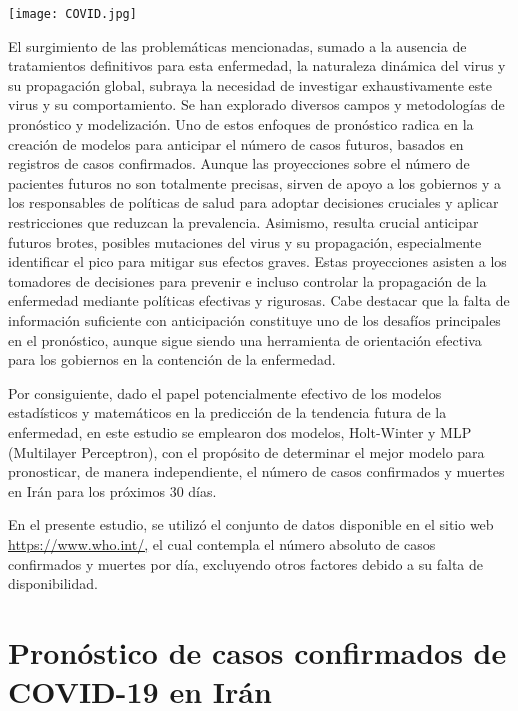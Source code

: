 \documentclass[
  letterpaper,
  DIV=11,
  numbers=noendperiod]{scrreport}
\theoremstyle{plain}
\theoremstyle{definition}
\theoremstyle{definition}
\theoremstyle{plain}
\theoremstyle{remark}
\begin{document}
\begin{center}
\texttt{[image: COVID.jpg]}
\end{center}

El surgimiento de las problemáticas mencionadas, sumado a la ausencia de
tratamientos definitivos para esta enfermedad, la naturaleza dinámica
del virus y su propagación global, subraya la necesidad de investigar
exhaustivamente este virus y su comportamiento. Se han explorado
diversos campos y metodologías de pronóstico y modelización. Uno de
estos enfoques de pronóstico radica en la creación de modelos para
anticipar el número de casos futuros, basados en registros de casos
confirmados. Aunque las proyecciones sobre el número de pacientes
futuros no son totalmente precisas, sirven de apoyo a los gobiernos y a
los responsables de políticas de salud para adoptar decisiones cruciales
y aplicar restricciones que reduzcan la prevalencia. Asimismo, resulta
crucial anticipar futuros brotes, posibles mutaciones del virus y su
propagación, especialmente identificar el pico para mitigar sus efectos
graves. Estas proyecciones asisten a los tomadores de decisiones para
prevenir e incluso controlar la propagación de la enfermedad mediante
políticas efectivas y rigurosas. Cabe destacar que la falta de
información suficiente con anticipación constituye uno de los desafíos
principales en el pronóstico, aunque sigue siendo una herramienta de
orientación efectiva para los gobiernos en la contención de la
enfermedad.

Por consiguiente, dado el papel potencialmente efectivo de los modelos
estadísticos y matemáticos en la predicción de la tendencia futura de la
enfermedad, en este estudio se emplearon dos modelos, Holt-Winter y MLP
(Multilayer Perceptron), con el propósito de determinar el mejor modelo
para pronosticar, de manera independiente, el número de casos
confirmados y muertes en Irán para los próximos 30 días.

En el presente estudio, se utilizó el conjunto de datos disponible en el
sitio web \url{https://www.who.int/,} el cual contempla el número
absoluto de casos confirmados y muertes por día, excluyendo otros
factores debido a su falta de disponibilidad.

\chapter{Pronóstico de casos confirmados de COVID-19 en
Irán}\label{pronuxf3stico-de-casos-confirmados-de-covid-19-en-iruxe1n}
\end{document}
